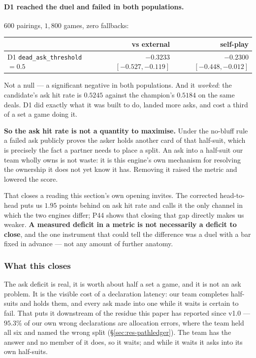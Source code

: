 \documentclass[11pt,letterpaper]{article}
\begin{document}
\paragraph{D1 reached the duel and failed in both populations.} $600$
pairings, $1{,}800$ games, zero fallbacks:

\begin{center}
\small
\begin{tabular}{lrr}
\toprule
 & vs external & self-play \\
\midrule
D1 \texttt{dead\_ask\_threshold} $=0.5$ & $\mathbf{-0.3233}$ $[-0.527,
-0.119]$ & $\mathbf{-0.2300}$ $[-0.448, -0.012]$ \\
\bottomrule
\end{tabular}
\end{center}

\noindent Not a null --- a significant negative in both populations. And it
\emph{worked}: the candidate's ask hit rate is $0.5245$ against the champion's
$0.5184$ on the same deals. D1 did exactly what it was built to do, landed more
asks, and cost a third of a set a game doing it.

\textbf{So the ask hit rate is not a quantity to maximise.} Under the no-bluff
rule a failed ask publicly proves the asker holds another card of that
half-suit, which is precisely the fact a partner needs to place a split. An ask
into a half-suit our team wholly owns is not waste: it is this engine's own
mechanism for resolving the ownership it does not yet know it has. Removing it
raised the metric and lowered the score.

That closes a reading this section's own opening invites. The corrected
head-to-head puts us $1.95$ points behind on ask hit rate and calls it the only
channel in which the two engines differ; P44 shows that closing that gap
directly makes us weaker. \textbf{A measured deficit in a metric is not
necessarily a deficit to close}, and the one instrument that could tell the
difference was a duel with a bar fixed in advance --- not any amount of further
anatomy.

\subsubsection{What this closes}

The ask deficit is real, it is worth about half a set a game, and it is not an
ask problem. It is the visible cost of a declaration latency: our team completes
half-suits and holds them, and every ask made into one while it waits is
certain to fail. That puts it downstream of the residue this paper has reported
since v1.0 --- $95.3\%$ of our own wrong declarations are allocation errors,
where the team held all six and named the wrong split (\S\ref{sec:res-pathledger}).
The team has the answer and no member of it does, so it waits; and while it
waits it asks into its own half-suits.
\end{document}
